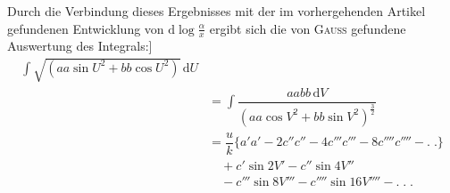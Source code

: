 Durch die Verbindung dieses Ergebnisses mit der im vorhergehenden Artikel gefundenen Entwicklung von $\mathrm{d}\log\frac{\alpha}{x}$ ergibt sich die von \textsc{Gauss} gefundene Auswertung des Integrals:]
\[
\begin{aligned}
\int\surd{(aa\sin U^2+bb\cos U^2)}\,\mathrm{d}U
\\[7pt]&=\int\dfrac{aabb\,\mathrm{d}V}{(aa\cos V^2+bb\sin V^2)^{\frac32}}\\
&=\dfrac{u}{k}\{a'a'-2c''c''-4c'''c'''-8c''''c''''-.\;.\}\\
&\quad+c'\sin 2V'-c''\sin 4V''\\&\quad-c'''\sin 8V'''-c''''\sin 16V''''-.\;.\;.\end{aligned}
\]

\clearpage
\endgroup

